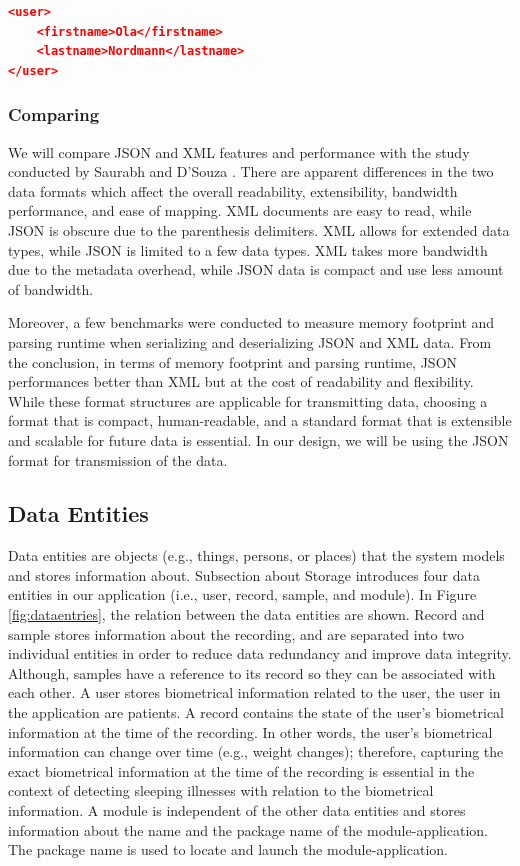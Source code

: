 \begin{lstlisting}[language=json, caption={My Caption}, captionpos=b]
<user>
    <firstname>Ola</firstname>
    <lastname>Nordmann</lastname>
</user>
\end{lstlisting}

\subsubsection{Comparing}
We will compare JSON and XML features and performance with the study conducted by Saurabh and D’Souza \cite{jsonvxml}. There are apparent differences in the two data formats which affect the overall readability, extensibility, bandwidth performance, and ease of mapping. XML documents are easy to read, while JSON is obscure due to the parenthesis delimiters. XML allows for extended data types, while JSON is limited to a few data types. XML takes more bandwidth due to the metadata overhead, while JSON data is compact and use less amount of bandwidth.

Moreover, a few benchmarks were conducted to measure memory footprint and parsing runtime when serializing and deserializing JSON and XML data. From the conclusion,  in terms of memory footprint and parsing runtime, JSON performances better than XML but at the cost of readability and flexibility. While these format structures are applicable for transmitting data, choosing a format that is compact, human-readable, and a standard format that is extensible and scalable for future data is essential. In our design, we will be using the JSON format for transmission of the data.

\subsection{Data Entities}
Data entities are objects (e.g., things, persons, or places) that the system models and stores information about. Subsection about Storage introduces four data entities in our application (i.e., user, record, sample, and module). In Figure \ref{fig:dataentries}, the relation between the data entities are shown. Record and sample stores information about the recording, and are separated into two individual entities in order to reduce data redundancy and improve data integrity. Although, samples have a reference to its record so they can be associated with each other. A user stores biometrical information related to the user, the user in the application are patients. A record contains the state of the user's biometrical information at the time of the recording. In other words, the user's biometrical information can change over time (e.g.,  weight changes); therefore, capturing the exact biometrical information at the time of the recording is essential in the context of detecting sleeping illnesses with relation to the biometrical information.  A module is independent of the other data entities and stores information about the name and the package name of the module-application. The package name is used to locate and launch the module-application. 

